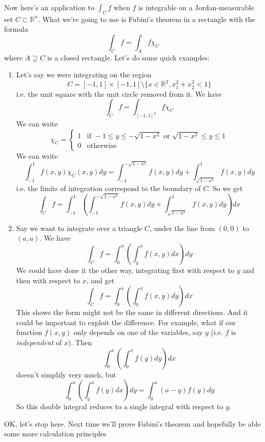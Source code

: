 \documentclass{article}
\newcommand{\reals}[0]{\mathbb{R}}
\newcommand{\indic}[1]{\chi_{#1}}
\begin{document}
  Now here's an application to \(\int_Cf\) when \(f\) is integrable on a Jordan-measurable set \(C \subset \reals^n\). What we're going to use is Fubini's theorem in a rectangle with the formula
  \[\int_Cf = \int_Af\indic{C}\]
  where \(A \supseteq C\) is a closed rectangle.
  Let's do some quick examples:
  \begin{enumerate}

  \item Let's say we were integrating on the region
  \[C = [-1, 1] \times [-1, 1] \setminus \{x \in \reals^2, x_1^2 + x_2^2 < 1\}\]
  i.e. the unit square with the unit circle removed from it. We have
  \[\int_Cf = \int_{[-1, 1]^2}f\indic{C}\]
  We can write
  \[\indic{C} = \left\{\begin{array}{cc}
    1 & \text{if } -1 \leq y \leq -\sqrt{1 - x^2} \text{ or } \sqrt{1 - x^2} \leq y \leq 1 \\
    0 & \text{otherwise}
  \end{array}\right.\]
  We can write
  \[\int_{-1}^1f(x, y)\indic{C}(x, y)dy = \int_{-1}^{-\sqrt{1 - x^2}}f(x, y)dy + \int_{\sqrt{1 - x^2}}^1f(x, y)dy\]
  i.e. the limits of integration correspond to the boundary of \(C\). So we get
  \[\int_Cf = \int_{-1}^1\left(\int_{-1}^{-\sqrt{1 - x^2}}f(x, y)dy + \int_{\sqrt{1 - x^2}}^1f(x, y)dy\right)dx\]

  \item Say we want to integrate over a triangle \(C\), under the line from \((0, 0)\) to \((a, a)\). We have
  \[\int_Cf = \int_0^a\left(\int_y^af(x, y)dx\right)dy\]
  We could have done it the other way, integrating first with respect to \(y\) and then with respect to \(x\), and get
  \[\int_Cf = \int_0^a\left(\int_0^xf(x, y)dy\right)dx\]
  This shows the form might not be the same in different directions. And it could be important to exploit the difference. For example, what if our function \(f(x, y)\) only depends on one of the variables, say \(y\) (i.e. \(f\) is \textit{independent} of \(x\)). Then
  \[\int_0^a\left(\int_0^xf(y)dy\right)dx\]
  doesn't simplify very much, but
  \[\int_0^a\left(\int_y^af(y)dx\right)dy = \int_0^a(a - y)f(y)dy\]
  So this double integral reduces to a single integral with respect to \(y\).


\end{enumerate}
OK, let's stop here. Next time we'll prove Fubini's theorem and hopefully be able some more calculation principles
\end{document}
